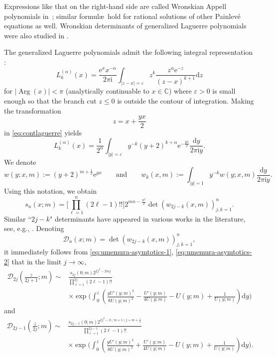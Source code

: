 \documentclass[pdftex]{sigma}
\numberwithin{equation}{section}
\newcommand{\ee}{\mathrm{e}}
\newcommand{\dd}{\mathrm{d}}
\newcommand{\ii}{\mathrm{i}}
\renewcommand{\arg}{\operatorname{Arg}}
\begin{document}
Expressions like that on the right-hand side are called Wronskian Appell polynomials in~\cite{BHSS}; similar formul\ae\ hold for rational solutions of other Painlev\'e equations as well. Wronskian determinants of generalized Laguerre polynomials were also studied in \cite{CD}.

The generalized Laguerre polynomials admit the following integral representation \cite[equation~(18.10.8)]{DLMF}:
\begin{equation}\label{eq:contlaguerre}
 L_k^{(\alpha)}(x)=\frac{\ee^x x^{-\alpha}}{2\pi \ii}\int_{|z-x|=\varepsilon}z^k\frac{z^\alpha \ee^{-z}}{(z-x)^{k+1}} \dd z
\end{equation}
for $|{\arg}(x)|<\pi$ (analytically continuable to $x\in\mathbb{C}$) where $\varepsilon >0$ is small enough so that the branch cut $z\le 0$ is outside the contour of integration. Making the transformation \[z=x+\frac{yx}{2}\] in \eqref{eq:contlaguerre} yields
\begin{equation*}%
 L_k^{(\alpha)}(x)=\frac{1}{2^{\alpha}}\int_{|y|=\varepsilon}y^{-k}{(y+2)^{k+\alpha} \ee^{-\frac{yx}{2}}}\frac{\dd y}{2\pi \ii y}.
\end{equation*}
We denote
\[w(y;x,m):=(y+2)^{m+\frac{1}{2}} \ee^{{yx}{}} \qquad \text{and} \qquad w_k(x,m):=\int_{|y|=1}y^{-k}w(y;x,m)\frac{\dd y}{2\pi \ii y}.\]
Using this notation, we obtain
\begin{equation}\label{eq:lag}
 s_{n}(x;m)=\Bigg[\prod_{\ell=1}^n(2\ell-1)!!\Bigg]2^{mn-\frac{n^2}{2}}\det(w_{2j-k}(x,m))_{j,k=1}^{n}.
\end{equation}
Similar ``$2j - k$" determinants have appeared in various works in the literature, see, e.g., \cite{gharakhloo_witte}. Denoting
\begin{equation*}
\boldsymbol{\mathscr{D}}_n(x;m)=\det\left(w_{2j-k}(x,m)\right)_{j,k=1}^{n},
\end{equation*}
it immediately follows from \eqref{eq:umemura-asymtotics-1}, \eqref{eq:umemura-asymtotics-2} that in the limit $j\to\infty$,
\begin{align*}
\boldsymbol{\mathscr{D}}_{2j}\left(\frac{z}{2j+1};m\right)\sim{}&\frac{s_{2j}(0;m)2^{2{j^2}{}-2mj}}{\prod_{\ell=1}^{2j}(2\ell-1)!!}\\
&\times \exp\Bigg(\int_0^z\left(\frac{y U'(y;m)^2}{8 U(y;m)^2}-\frac{U'(y;m)}{4 U(y;m)}-U(y;m)+\frac{1}{U(y;m)}\right) \dd y\Bigg)
\end{align*}
and
\begin{align*}
\boldsymbol{\mathscr{D}}_{2j-1}\left(\frac{z}{2j};m\right) \sim{}&\frac{s_{2j-1}(0;m)2^{2j^2-2(m+1)j+m+\frac{1}{2}}}{\prod_{\ell=1}^{2j-1}(2\ell-1)!!}\\
&\times \exp\Bigg(\int_0^{z}\left(\frac{y U'(y;m)^2}{8 U(y;m)^2}+\frac{U'(y;m)}{4 U(y;m)}-U(y;m)+\frac{1}{U(y;m)}\right) \dd y\Bigg).
\end{align*}
\end{document}

